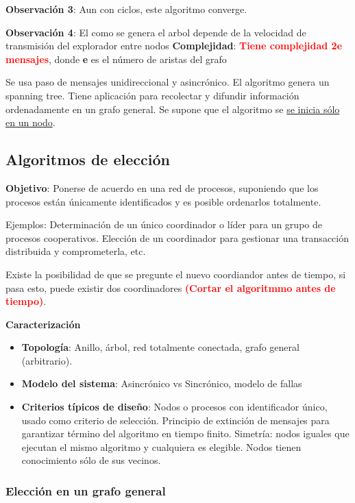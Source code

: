 \textbf{Observación 3}: Aun con ciclos, este algoritmo converge.

\textbf{Observación 4}: El como se genera el arbol depende de la velocidad de transmisión del explorador entre nodos 
\textbf{Complejidad}: \textcolor{red}{\textbf{Tiene complejidad 2e mensajes}}, donde \textbf{e} es el número de aristas del grafo

Se usa paso de mensajes unidireccional y asincrónico. El algoritmo genera un spanning tree. Tiene aplicación para recolectar y difundir información ordenadamente en un grafo general. Se supone que el algoritmo se \underline{se inicia sólo en un nodo}.

\subsection{Algoritmos de elección}
\textbf{Objetivo}: Ponerse de acuerdo en una red de procesos, suponiendo que los procesos están únicamente identificados y es posible ordenarlos totalmente.

Ejemplos: Determinación de un único coordinador o líder para un grupo de procesos cooperativos. Elección de un coordinador para gestionar una transacción distribuida y comprometerla, etc.

Existe la posibilidad de que se pregunte el nuevo coordiandor antes de tiempo, si pasa esto, puede existir dos coordinadores \textcolor{red}{\textbf{(Cortar el algoritmmo antes de tiempo)}}.
\vspace{0.5em}

\textbf{Caracterización} \begin{itemize}
    \item \textbf{Topología}: Anillo, árbol, red totalmente conectada, grafo general (arbitrario).
    \item \textbf{Modelo del sistema}: Asincrónico vs Sincrónico, modelo de fallas
    \item \textbf{Criterios típicos de diseño}: Nodos o procesos con identificador único, usado como criterio de selección. Principio de extinción de mensajes para garantizar término del algoritmo en tiempo finito. Simetría: nodos iguales que ejecutan el mismo algoritmo y cualquiera es elegible. Nodos tienen conocimiento sólo de sus vecinos.
\end{itemize}

\subsubsection{Elección en un grafo general}


